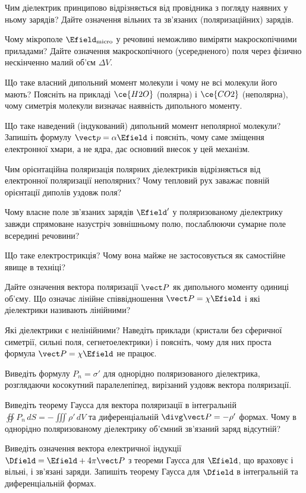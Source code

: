 \begin{Questions}
\begin{quizlist}
	\item Чим діелектрик принципово відрізняється від провідника з погляду наявних у ньому зарядів? Дайте означення вільних та зв'язаних (поляризаційних) зарядів.
	\item Чому мікрополе $\Efield_\text{micro}$ у речовині неможливо виміряти макроскопічними приладами? Дайте означення макроскопічного (усередненого) поля через фізично нескінченно малий об'єм $\Delta V$.
	\item Що таке власний дипольний момент молекули і чому не всі молекули його мають? Поясніть на прикладі $\ce{H2O}$ (полярна) і $\ce{CO2}$ (неполярна), чому симетрія молекули визначає наявність дипольного моменту.
	\item Що таке наведений (індукований) дипольний момент неполярної молекули? Запишіть формулу $\vect p = \alpha\Efield$ і поясніть, чому саме зміщення електронної хмари, а не ядра, дає основний внесок у цей механізм.
	\item Чим орієнтаційна поляризація полярних діелектриків відрізняється від електронної поляризації неполярних? Чому тепловий рух заважає повній орієнтації диполів уздовж поля?
	\item Чому власне поле зв'язаних зарядів $\Efield'$ у поляризованому діелектрику завжди спрямоване назустріч зовнішньому полю, послаблюючи сумарне поле всередині речовини?
	\item Що таке електрострикція? Чому вона майже не застосовується як самостійне явище в техніці?
	\item Дайте означення вектора поляризації $\vect P$ як дипольного моменту одиниці об'єму. Що означає лінійне співвідношення $\vect P = \chi\Efield$ і які діелектрики називають лінійними?
	\item Які діелектрики є нелінійними? Наведіть приклади (кристали без сферичної симетрії, сильні поля, сегнетоелектрики) і поясніть, чому для них проста формула $\vect P=\chi\Efield$ не працює.
	\item Виведіть формулу $P_n = \sigma'$ для однорідно поляризованого діелектрика, розглядаючи косокутний паралелепіпед, вирізаний уздовж вектора поляризації.
	\item Виведіть теорему Гаусса для вектора поляризації в інтегральній $\oiint P_n\,dS = -\iiint \rho'\,dV$ та диференціальній $\divg\vect P = -\rho'$ формах. Чому в однорідно поляризованому діелектрику об'ємний зв'язаний заряд відсутній?
	\item Виведіть означення вектора електричної індукції $\Dfield = \Efield + 4\pi\vect P$ з теореми Гаусса для $\Efield$, що враховує і вільні, і зв'язані заряди. Запишіть теорему Гаусса для $\Dfield$ в інтегральній та диференціальній формах.

\end{quizlist}
\end{Questions}
